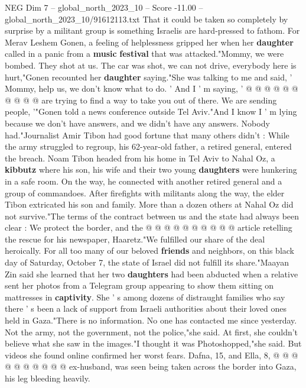 \begin{textsample}{NEG Dim 7 – global\_north\_2023\_10 – Score -11.00 – global\_north\_2023\_10/91612113.txt}
That it could be taken so completely by surprise by a militant group is something Israelis are hard-pressed to fathom.
For Merav Leshem Gonen, a feeling of helplessness gripped her when her \textbf{daughter} called in a panic from a \textbf{music} \textbf{festival} that was attacked."Mommy, we were bombed.
They shot at us.
The car was shot, we can not drive, everybody here is hurt,"Gonen recounted her \textbf{daughter} saying."She was talking to me and said, ' Mommy, help us, we don't know what to do. ' And I ' m saying, ' @ @ @ @ @ @ @ @ @ @ are trying to find a way to take you out of there.
We are sending people, '"Gonen told a news conference outside Tel Aviv."And I know I ' m lying because we don't have answers, and we didn't have any answers.
Nobody had."Journalist Amir Tibon had good fortune that many others didn't : While the army struggled to regroup, his 62-year-old father, a retired general, entered the breach.
Noam Tibon headed from his home in Tel Aviv to Nahal Oz, a \textbf{kibbutz} where his son, his wife and their two young \textbf{daughters} were hunkering in a safe room.
On the way, he connected with another retired general and a group of commandoes.
After firefights with militants along the way, the elder Tibon extricated his son and family.
More than a dozen others at Nahal Oz did not survive."The terms of the contract between us and the state had always been clear : We protect the border, and the @ @ @ @ @ @ @ @ @ @ article retelling the rescue for his newspaper, Haaretz."We fulfilled our share of the deal heroically.
For all too many of our beloved \textbf{friends} and neighbors, on this black day of Saturday, October 7, the state of Israel did not fulfill its share."Maayan Zin said she learned that her two \textbf{daughters} had been abducted when a relative sent her photos from a Telegram group appearing to show them sitting on mattresses in \textbf{captivity}.
She ' s among dozens of distraught families who say there ' s been a lack of support from Israeli authorities about their loved ones held in Gaza."There is no information.
No one has contacted me since yesterday.
Not the army, not the government, not the police,"she said.
At first, she couldn't believe what she saw in the images."I thought it was Photoshopped,"she said.
But videos she found online confirmed her worst fears.
Dafna, 15, and Ella, 8, @ @ @ @ @ @ @ @ @ @ ex-husband, was seen being taken across the border into Gaza, his leg bleeding heavily.

\end{textsample}
